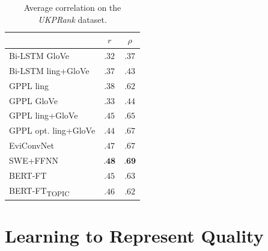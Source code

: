 \documentclass[letterpaper]{article} %
\begin{document}
\begin{table}[htb]
\begin{center}
\begin{tabular}{ |l|c|c|  }
 \hline
 & $r$ & $\rho$ \\
 \hline
 Bi-LSTM GloVe & $.32$ & $.37$\\
 Bi-LSTM ling+GloVe & $.37$ & $.43$\\
 \hline
 GPPL ling & $.38$ & $.62$ \\
 GPPL GloVe & $.33$ & $.44$ \\
 GPPL ling+GloVe & $.45$ & $.65$ \\
 GPPL opt. ling+GloVe & $.44$ & $.67$\\
 \hline
 EviConvNet & $.47$ & $.67$ \\
 \hline
 SWE+FFNN & $\textbf{.48}$ & $\textbf{.69}$ \\
 \hline
 BERT-FT & $.45$ & $.63$ \\
 BERT-FT\textsubscript{TOPIC} & $.46$ & $.62$\\
 \hline
 \end{tabular}
 \end{center}
 \caption{Average correlation on the \textit{UKPRank} dataset.
 }
\label{table:resultsUKP}
\end{table}


\section{Learning to Represent Quality}
\label{analysisModels}
\end{document}
